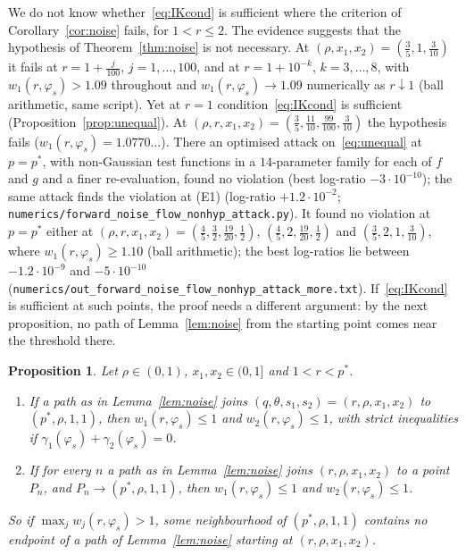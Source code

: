 \documentclass[11pt]{amsart}
\newtheorem{proposition}[theorem]{Proposition}
\theoremstyle{definition}
\begin{document}
We do not know whether~\eqref{eq:IKcond} is sufficient where the criterion of Corollary~\ref{cor:noise} fails, for
$1<r\le2$. The evidence suggests that the hypothesis of Theorem~\ref{thm:noise} is not necessary. At
$(\rho,x_1,x_2)=(\frac35,1,\frac3{10})$ it fails at $r=1+\frac j{100}$, $j=1,\dots,100$, and at $r=1+10^{-k}$,
$k=3,\dots,8$, with $w_1(r,\varphi_s)>1.09$ throughout and $w_1(r,\varphi_s)\to1.09$ numerically as $r\downarrow1$ (ball
arithmetic, same script). Yet at $r=1$ condition~\eqref{eq:IKcond} is sufficient (Proposition~\ref{prop:unequal}). At
$(\rho,r,x_1,x_2)=(\frac35,\frac{11}{10},\frac{99}{100},\frac3{10})$ the hypothesis fails ($w_1(r,\varphi_s)=1.0770\ldots$).
There an optimised attack on~\eqref{eq:unequal} at $p=p^*$, with non-Gaussian test functions in a $14$-parameter family
for each of $f$ and $g$ and a finer re-evaluation, found no violation (best log-ratio $-3\cdot10^{-10}$); the same
attack finds the violation at (E1) (log-ratio $+1.2\cdot10^{-2}$; \texttt{numerics/forward\_noise\_flow\_nonhyp\_attack.py}).
It found no violation at $p=p^*$ either at $(\rho,r,x_1,x_2)=(\frac45,\frac32,\frac{19}{20},\frac12)$, $(\frac45,2,\frac{19}{20},\frac12)$ and
$(\frac35,2,1,\frac3{10})$, where $w_1(r,\varphi_s)\ge1.10$ (ball arithmetic); the best log-ratios lie between
$-1.2\cdot10^{-9}$ and $-5\cdot10^{-10}$ (\texttt{numerics/out\_forward\_noise\_flow\_nonhyp\_attack\_more.txt}).
If~\eqref{eq:IKcond} is sufficient at such points, the proof needs a different argument: by the next proposition, no
path of Lemma~\ref{lem:noise} from the starting point comes near the threshold there.

\begin{proposition}\label{prop:noiseopt}
Let $\rho\in(0,1)$, $x_1,x_2\in(0,1]$ and $1<r<p^*$.
\begin{enumerate}[label=(\alph*)]
\item If a path as in Lemma~\ref{lem:noise} joins $(q,\theta,s_1,s_2)=(r,\rho,x_1,x_2)$ to $(p^*,\rho,1,1)$, then
$w_1(r,\varphi_s)\le1$ and $w_2(r,\varphi_s)\le1$, with strict inequalities if $\gamma_1(\varphi_s)+\gamma_2(\varphi_s)=0$.
\item If for every $n$ a path as in Lemma~\ref{lem:noise} joins $(r,\rho,x_1,x_2)$ to a point $P_n$, and
$P_n\to(p^*,\rho,1,1)$, then $w_1(r,\varphi_s)\le1$ and $w_2(r,\varphi_s)\le1$.
\end{enumerate}
So if $\max_jw_j(r,\varphi_s)>1$, some neighbourhood of $(p^*,\rho,1,1)$ contains no endpoint of a path of
Lemma~\ref{lem:noise} starting at $(r,\rho,x_1,x_2)$.
\end{proposition}
\end{document}
